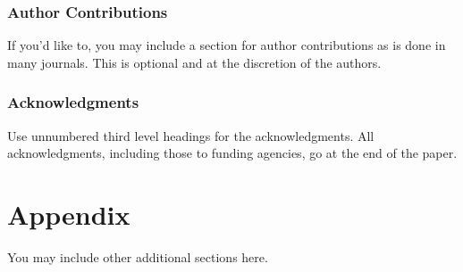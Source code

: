 \documentclass{article} %
\begin{document}
\subsubsection*{Author Contributions}
If you'd like to, you may include  a section for author contributions as is done
in many journals. This is optional and at the discretion of the authors.

\subsubsection*{Acknowledgments}
Use unnumbered third level headings for the acknowledgments. All
acknowledgments, including those to funding agencies, go at the end of the paper.




\appendix
\section{Appendix}
You may include other additional sections here.
\end{document}
